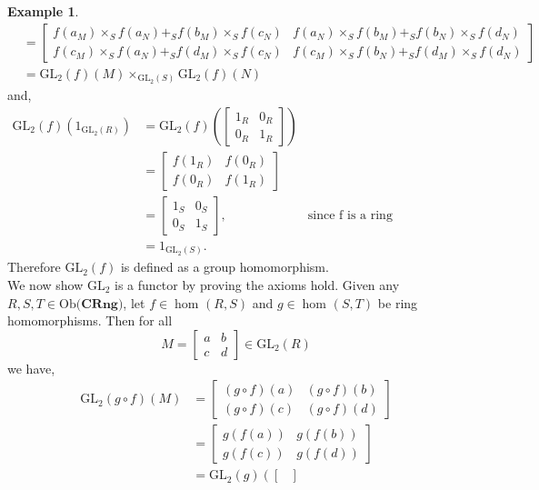 \documentclass[11pt,a4paper]{article}
\theoremstyle{definition}
\newtheorem{example}[thm]{Example}
\newcommand\ho[3][]{\hom_{#1}(#2,#3)}
\newcommand\ob[1]{\mathrm{Ob(}#1\mathrm{)}}
\newcommand{\GL}{\mathrm{GL}_{2}}
\numberwithin{equation}{section}
\begin{document}
\begin{example}
\begin{align*}
    &= \begin{bmatrix} 
    f(a_{M}) \times_{S}f(a_{N})+_{S}f(b_{M})\times_{S}f(c_{N})& f(a_{N})\times_{S}f(b_{M})+_{S}f(b_{N})\times_{S}f(d_{N})\\
    f(c_{M})\times_{S}f(a_{N})+_{S}f(d_{M})\times_{S}f(c_{N})& f(c_{M})\times_{S}f(b_{N})+_{S}f(d_{M})\times_{S} f(d_{N})
    \end{bmatrix}\\
    &= \GL(f)(M) \times_{\GL(S)} \GL(f)(N)
\end{align*}
and,
\begin{align*}
    \GL(f)(1_{\GL(R)}) &= \GL(f)\left( \begin{bmatrix}
    1_{R}&0_{R}\\
    0_{R}&1_{R}
    \end{bmatrix}\right)\\
    &= \begin{bmatrix}
    f(1_{R})&f(0_{R})\\
    f(0_{R})&f(1_{R})
    \end{bmatrix}\\
    &= \begin{bmatrix}
    1_{S}&0_{S}\\
    0_{S}&1_{S}
    \end{bmatrix}, &\text{since f is a ring homomorphism}\\
    &= 1_{\GL(S)}.
\end{align*}
Therefore $\GL(f)$ is defined as a group homomorphism.\\
We now show $\GL$ is a functor by proving the axioms hold. Given any $R,S,T\in\ob{\mathbf{CRng}}$, let $f\in\ho{R}{S}$ and $g\in\ho{S}{T}$ be ring homomorphisms. Then for all \[M=\begin{bmatrix} 
    a & b\\
    c&d
    \end{bmatrix}\in \GL(R)\]
    we have,
\begin{align*}
    \GL(g\circ f)(M)&=\begin{bmatrix} 
    (g\circ f)(a) & (g\circ f)(b)\\
    (g\circ f)(c)&(g\circ f)(d)
    \end{bmatrix}\\
    &= \begin{bmatrix} 
    g(f(a))& g(f(b))\\
    g(f(c))&g(f(d))
    \end{bmatrix}\\
    &= \GL(g)\left (\begin{bmatrix} 

\end{bmatrix}
\end{align*}
\end{example}
\end{document}
